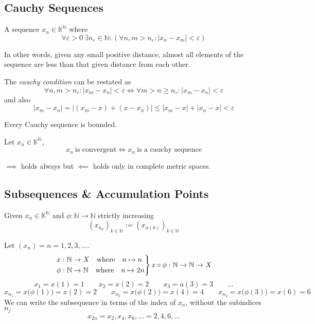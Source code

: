 \subsection{Cauchy Sequences}
\begin{definition}
   A sequence \(x_n \in \mathbb{K}^\mathbb{N}\) where
   \[\forall \varepsilon > 0~\exists n_\varepsilon \in \mathbb{N}: (\forall n, m > n_\varepsilon: |x_n - x_m| < \varepsilon)\]
\end{definition}
\begin{remark}[Intuition]
   In other words, given any small positive distance, almost all elements of the sequence are less than that given distance from each other.
\end{remark}
\begin{remark}[Tips]
   The \emph{cauchy condition} can be restated as
   \[\forall n, m > n_\varepsilon: |x_m - x_n| < \varepsilon \iff \forall m > n \geq n_\varepsilon: |x_m - x_n| < \varepsilon\]
   and also
   \[|x_m - x_n| = |(x_m - x) + (x - x_n)| \leq |x_m - x| + |x_n - x| < \varepsilon\]
\end{remark}

\begin{theorem}\label{thm:cauchy_bound}
   Every Cauchy sequence is bounded.
\end{theorem}

\begin{theorem}\label{thm:cauchy_crit_seq}
   Let \(x_n \in \mathbb{K}^\mathbb{N}\),
   \[x_n~\text{is convergent} \iff x_n~\text{is a cauchy sequence}\]
\end{theorem}
\begin{remark}
   \(\implies\) holds always but \(\impliedby\) holds only in complete metric spaces.
\end{remark}

\subsection{Subsequences \& Accumulation Points}
\begin{definition}[Subsequence]
   Given \(x_n \in \mathbb{K}^\mathbb{N}\) and \(\phi: \mathbb{N} \to \mathbb{N}\) strictly increasing
   \[(x_{n_k})_{k \in \mathbb{N}} := (x_{\phi(k)})_{k \in \mathbb{N}}\]
\end{definition}
\begin{example}
   Let \((x_n) = n = 1, 2, 3, \ldots\).
   \[\begin{drcases}
         x: \mathbb{N} \to X \quad\text{where}\quad n \mapsto n \\
         \phi: \mathbb{N} \to \mathbb{N} \quad\text{where}\quad n \mapsto 2n
   \end{drcases} x \circ \phi: \mathbb{N} \to \mathbb{N} \to X\]
   \[x_1 = x(1) = 1 \qquad x_2 = x(2) = 2 \qquad x_3 = a(3) = 3 \qquad \ldots\]
   \[x_{n_1} = x\big(\phi(1)\big) = x(2) = 2 \qquad x_{n_2} = x\big(\phi(2)\big) = x(4) = 4 \qquad x_{n_3} = x\big(\phi(3)\big) = x(6) = 6\]
   We can write the subsequence in terms of the index of \(x_n\), without the subindices \(n_j\)
   \[x_{2n} = x_2, x_4, x_6, \ldots = 2, 4, 6, \ldots\]
\end{example}

